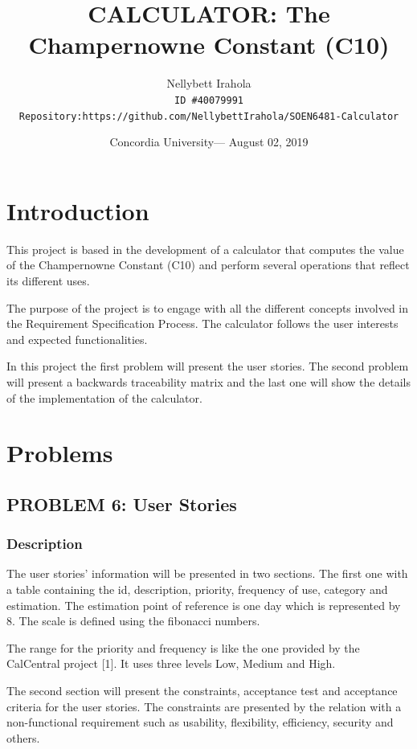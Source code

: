 \documentclass{report}
\title{\vspace{-2cm}CALCULATOR: The Champernowne Constant (C10)} %
\author{Nellybett Irahola\\ \texttt{ID \#40079991}\\ \texttt{Repository:https://github.com/NellybettIrahola/SOEN6481-Calculator}} %
\date{Concordia University--- August 02, 2019} %
\begin{document}
\maketitle %
\listoffigures
\listoftables
\tableofcontents{}
\chapter{Introduction}

This project is based in the development of a calculator that computes the value of the Champernowne Constant (C10) and perform several operations that reflect its different uses. 

The purpose of the project is to engage with all the different concepts involved in the Requirement Specification Process. The calculator follows the user interests and expected functionalities.

In this project the first problem will present the user stories. The second problem will present a backwards traceability matrix and the last one will show the details of the implementation of the calculator.

\newpage
\chapter{Problems}

\section{PROBLEM 6: User Stories}

\subsection{Description}

The user stories' information will be presented in two sections. The first one with a table containing the id, description, priority, frequency of use, category and estimation. The estimation point of reference is one day which is represented by 8. The scale is defined using the fibonacci numbers.

The range for the priority and frequency is like the one provided by the CalCentral project [1]. It uses three levels Low, Medium and High.

The second section will present the constraints, acceptance test and acceptance criteria for the user stories. The constraints are presented by the relation with a non-functional requirement such as usability, flexibility, efficiency, security and others.
\end{document}

